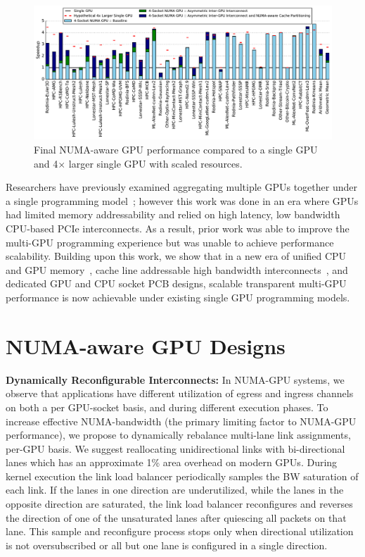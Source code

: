 \documentclass{sig-alternate}
\begin{document}
\begin{figure}[!t]
	\centering
	\includegraphics[width=1.0\textwidth]{figures/plot_final_speedup_WB_nvlink_first.pdf}
	\caption{Final NUMA-aware GPU performance compared to a single GPU and 4$\times$ 
	larger single GPU with scaled resources.}
	\vspace{-0.2in}
	\label{fig:combined}
\end{figure}

Researchers have previously examined aggregating multiple GPUs together under a single 
programming model~\cite{lee2013transparent,Cabezas2015}; however this work was 
done in an era where GPUs had limited memory addressability and relied on high 
latency, low bandwidth CPU-based PCIe interconnects. As a result, prior work 
was able to improve the multi-GPU programming experience but was unable to achieve
performance scalability. Building upon this work, we show that in a new
era of unified CPU and GPU memory~\cite{UVM}, cache line addressable high 
bandwidth interconnects~\cite{NVLINK}, and dedicated GPU and CPU socket PCB 
designs, scalable transparent multi-GPU performance is now achievable under 
existing single GPU programming models.

\vspace{-.05in}
\section{NUMA-aware GPU Designs}

\textbf{Dynamically Reconfigurable Interconnects:} In NUMA-GPU systems, we 
observe that applications have different utilization of egress and ingress 
channels on both a per GPU-socket basis, and during different execution phases. 
To increase effective NUMA-bandwidth (the primary limiting factor to NUMA-GPU 
performance), we propose to dynamically rebalance multi-lane link assignments, 
per-GPU basis. We suggest reallocating unidirectional links with bi-directional 
lanes which has an approximate 1\% area overhead on modern GPUs. During kernel 
execution the link load balancer periodically samples the BW saturation of each 
link. If the lanes in one direction are underutilized, while the lanes in the 
opposite direction are saturated, the link load balancer reconfigures and 
reverses the direction of one of the unsaturated lanes after quiescing all 
packets on that lane. This sample and reconfigure process stops only when 
directional utilization is not oversubscribed or all but one lane is configured 
in a single direction.
\end{document}
